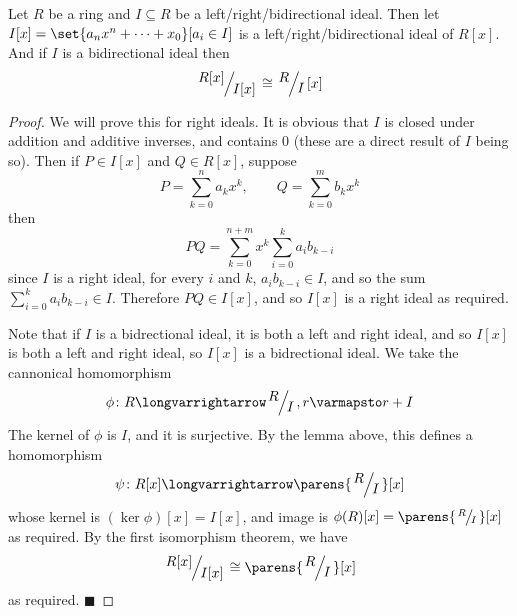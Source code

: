 \documentclass[10pt]{article}
\let\longto=\longvarrightarrow
\def\qed{\hskip1cm\hbox{}\hfill$\blacksquare$}
\begin{document}
\begin{prop*}

    Let $R$ be a ring and $I\subseteq R$ be a left/right/bidirectional ideal.
    Then let $I[x]=\set{a_nx^n+\cdots+x_0}[a_i\in I]$ is a left/right/bidirectional ideal of $R[x]$.
    And if $I$ is a bidirectional ideal then
    \[ \slfrac{R[x]}{I[x]} \cong \slfrac RI[x] \]

\end{prop*}

\begin{proof}

    We will prove this for right ideals.
    It is obvious that $I$ is closed under addition and additive inverses, and contains $0$ (these are a direct result of $I$ being so).
    Then if $P\in I[x]$ and $Q\in R[x]$, suppose
    \[ P = \sum_{k=0}^n a_kx^k,\qquad Q = \sum_{k=0}^m b_kx^k \]
    then
    \[ PQ = \sum_{k=0}^{n+m} x^k\sum_{i=0}^k a_ib_{k-i} \]
    since $I$ is a right ideal, for every $i$ and $k$, $a_ib_{k-i}\in I$, and so the sum $\sum_{i=0}^k a_ib_{k-i}\in I$.
    Therefore $PQ\in I[x]$, and so $I[x]$ is a right ideal as required.

    Note that if $I$ is a bidrectional ideal, it is both a left and right ideal, and so $I[x]$ is both a left and right ideal, so $I[x]$ is a bidrectional ideal.
    We take the cannonical homomorphism
    \[ \phi\colon R\longto\slfrac RI, r\varmapsto r+I \]
    The kernel of $\phi$ is $I$, and it is surjective.
    By the lemma above, this defines a homomorphism
    \[ \psi\colon R[x]\longto\parens{\slfrac RI}[x] \]
    whose kernel is $(\ker\phi)[x]=I[x]$, and image is $\phi(R)[x]=\parens{\slfrac RI}[x]$ as required.
    By the first isomorphism theorem, we have
    \[ \slfrac{R[x]}{I[x]} \cong \parens{\slfrac RI}[x] \]
    as required.
    \qed

\end{proof}
\end{document}
